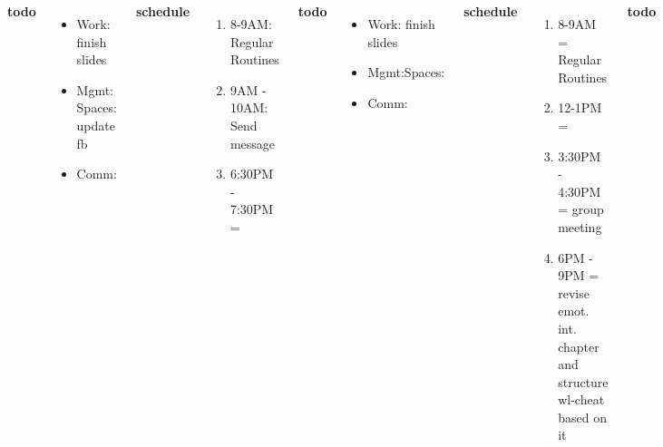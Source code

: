 \begin{frame}
{\begin{columns}
          \textbf{\small todo} \\
          \begin{itemize}
            \tiny \item \tiny Work: finish slides   
          \item \tiny Mgmt: Spaces: update fb 
          \item \tiny Comm: 
          \end{itemize}
          \textbf{\small schedule} \\
          \begin{enumerate}
            \tiny \item \tiny 8-9AM: Regular Routines 
          \item \tiny 9AM - 10AM: Send message 
            \item \tiny 6:30PM - 7:30PM = 
          \end{enumerate} 
          \textbf{\small todo}\\
          \begin{itemize}  
            \tiny \item \tiny Work: finish slides 
            \item \tiny Mgmt:Spaces: 
            \item \tiny Comm: 

          \end{itemize} 

          \textbf{\small schedule}\\
          \begin{enumerate} 
            \tiny \item \tiny 8-9AM = Regular Routines 
            \item \tiny 12-1PM = 
            \item \tiny 3:30PM - 4:30PM = group meeting 
            \item \tiny 6PM - 9PM = revise emot. int. chapter and
              structure wl-cheat based on it 
          \end{enumerate} 
          
          \textbf{\small todo}\\ 
          \begin{itemize}
            \tiny \item \tiny Work: updates on GPU \dl{} \te{} \prio{}


\end{itemize}
\end{columns}}
\end{frame}
